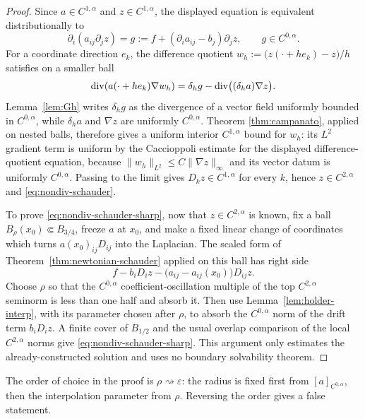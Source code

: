 \begin{proof}
Since $a\in C^{1,\alpha}$ and $z\in C^{1,\alpha}$, the displayed equation is
equivalent distributionally to
\begin{equation}\label{eq:nondiv-as-div}
  \partial_i(a_{ij}\partial_jz)
  =g:=f+(\partial_i a_{ij}-b_j)\partial_jz,
  \qquad g\in C^{0,\alpha}.
\end{equation}
For a coordinate direction $e_k$, the difference quotient
$w_h:=\bigl(z(\cdot+he_k)-z\bigr)/h$ satisfies on a smaller ball
\[
 \operatorname{div}(a(\cdot+he_k)\nabla w_h)
 =\delta_hg-\operatorname{div}\bigl((\delta_ha)\nabla z\bigr).
\]
Lemma~\ref{lem:Gh} writes $\delta_hg$ as the divergence of a vector field
uniformly bounded in $C^{0,\alpha}$, while
$\delta_ha$ and $\nabla z$ are uniformly $C^{0,\alpha}$.  Theorem
\ref{thm:campanato}, applied on nested balls, therefore gives a uniform
interior $C^{1,\alpha}$ bound for $w_h$: its $L^2$ gradient term is uniform
by the Caccioppoli estimate for the displayed difference-quotient equation,
because $\|w_h\|_{L^2}\le C\|\nabla z\|_\infty$ and its vector datum is
uniformly $C^{0,\alpha}$.  Passing to the limit gives
$D_kz\in C^{1,\alpha}$ for every $k$, hence $z\in C^{2,\alpha}$ and
\eqref{eq:nondiv-schauder}.

To prove \eqref{eq:nondiv-schauder-sharp}, now that $z\in C^{2,\alpha}$ is
known, fix a ball $B_\rho(x_0)\Subset B_{3/4}$, freeze $a$ at $x_0$, and make
a fixed linear change of coordinates which turns $a(x_0)_{ij}D_{ij}$ into
the Laplacian.  The scaled form of Theorem~\ref{thm:newtonian-schauder}
applied on this ball has right side
\[
 f-b_iD_iz-\bigl(a_{ij}-a_{ij}(x_0)\bigr)D_{ij}z.
\]
Choose $\rho$ so that the $C^{0,\alpha}$ coefficient-oscillation multiple of
the top $C^{2,\alpha}$ seminorm is less than one half and absorb it.  Then
use Lemma~\ref{lem:holder-interp}, with its parameter chosen after $\rho$, to
absorb the $C^{0,\alpha}$ norm of the drift term $b_iD_iz$.  A finite cover of
$B_{1/2}$ and the usual overlap comparison of the local $C^{2,\alpha}$ norms
give \eqref{eq:nondiv-schauder-sharp}.  This argument only estimates the
already-constructed solution and uses no boundary solvability theorem.
\end{proof}

\begin{constants}\label{const:nondiv-order}
The order of choice in the proof is
$\rho\rightsquigarrow\varepsilon$: the radius is fixed first from
$[a]_{C^{0,\alpha}}$, then the interpolation parameter from $\rho$.
Reversing the order gives a false statement.
\end{constants}

